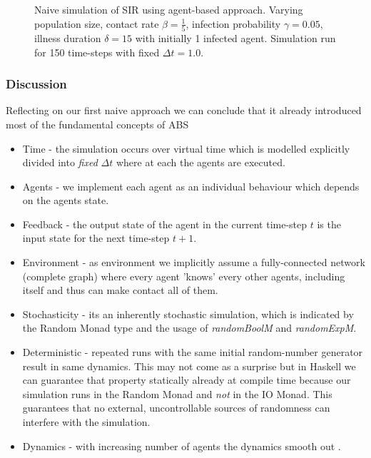 \begin{figure}
\begin{center}
	\caption{Naive simulation of SIR using agent-based approach. Varying population size, contact rate $\beta = \frac{1}{5}$, infection probability $\gamma = 0.05$, illness duration $\delta = 15$ with initially 1 infected agent. Simulation run for 150 time-steps with fixed $\Delta t = 1.0$.} 
	\label{fig:sir_abs_dynamics_naive}
\end{center}
\end{figure}

\subsubsection{Discussion}
Reflecting on our first naive approach we can conclude that it already introduced most of the fundamental concepts of ABS
\begin{itemize}
	\item Time - the simulation occurs over virtual time which is modelled explicitly divided into \textit{fixed} $\Delta t$ where at each the agents are executed.
	\item Agents - we implement each agent as an individual behaviour which depends on the agents state.
	\item Feedback - the output state of the agent in the current time-step $t$ is the input state for the next time-step $t+1$.
	\item Environment - as environment we implicitly assume a fully-connected network (complete graph) where every agent 'knows' every other agents, including itself and thus can make contact all of them.
	\item Stochasticity - its an inherently stochastic simulation, which is indicated by the Random Monad type and the usage of \textit{randomBoolM} and \textit{randomExpM}.
	\item Deterministic - repeated runs with the same initial random-number generator result in same dynamics. This may not come as a surprise but in Haskell we can guarantee that property statically already at compile time because our simulation runs in the Random Monad and \textit{not} in the IO Monad. This guarantees that no external, uncontrollable sources of randomness can interfere with the simulation.
	\item Dynamics - with increasing number of agents the dynamics smooth out \cite{macal_agent-based_2010}.
\end{itemize}

